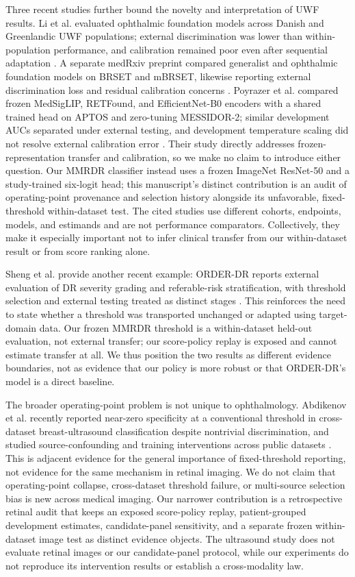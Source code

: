 \documentclass{ieeeaccess}
\begin{document}
Three recent studies further bound the novelty and interpretation of UWF results. Li et al. evaluated ophthalmic foundation models across Danish and Greenlandic UWF populations; external discrimination was lower than within-population performance, and calibration remained poor even after sequential adaptation \cite{li2026uwf}. A separate medRxiv preprint compared generalist and ophthalmic foundation models on BRSET and mBRSET, likewise reporting external discrimination loss and residual calibration concerns \cite{li2026mbrset}. Poyrazer et al. compared frozen MedSigLIP, RETFound, and EfficientNet-B0 encoders with a shared trained head on APTOS and zero-tuning MESSIDOR-2; similar development AUCs separated under external testing, and development temperature scaling did not resolve external calibration error \cite{poyrazer2026frozen}. Their study directly addresses frozen-representation transfer and calibration, so we make no claim to introduce either question. Our MMRDR classifier instead uses a frozen ImageNet ResNet-50 and a study-trained six-logit head; this manuscript's distinct contribution is an audit of operating-point provenance and selection history alongside its unfavorable, fixed-threshold within-dataset test. The cited studies use different cohorts, endpoints, models, and estimands and are not performance comparators. Collectively, they make it especially important not to infer clinical transfer from our within-dataset result or from score ranking alone.

Sheng et al. provide another recent example: ORDER-DR reports external evaluation of DR severity grading and referable-risk stratification, with threshold selection and external testing treated as distinct stages \cite{sheng2026orderdr}. This reinforces the need to state whether a threshold was transported unchanged or adapted using target-domain data. Our frozen MMRDR threshold is a within-dataset held-out evaluation, not external transfer; our score-policy replay is exposed and cannot estimate transfer at all. We thus position the two results as different evidence boundaries, not as evidence that our policy is more robust or that ORDER-DR's model is a direct baseline.

The broader operating-point problem is not unique to ophthalmology. Abdikenov et al. recently reported near-zero specificity at a conventional threshold in cross-dataset breast-ultrasound classification despite nontrivial discrimination, and studied source-confounding and training interventions across public datasets \cite{abdikenov2026}. This is adjacent evidence for the general importance of fixed-threshold reporting, not evidence for the same mechanism in retinal imaging. We do not claim that operating-point collapse, cross-dataset threshold failure, or multi-source selection bias is new across medical imaging. Our narrower contribution is a retrospective retinal audit that keeps an exposed score-policy replay, patient-grouped development estimates, candidate-panel sensitivity, and a separate frozen within-dataset image test as distinct evidence objects. The ultrasound study does not evaluate retinal images or our candidate-panel protocol, while our experiments do not reproduce its intervention results or establish a cross-modality law.
\end{document}
